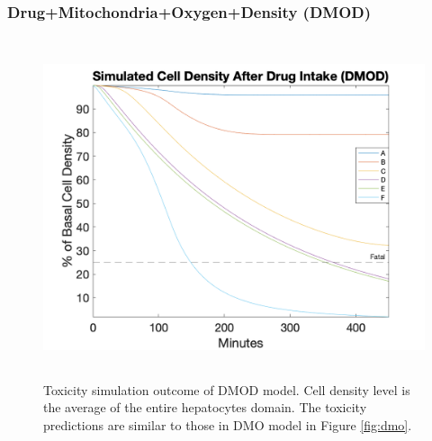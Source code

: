 \documentclass[12pt]{article}
\begin{document}
\subsubsection{Drug+Mitochondria+Oxygen+Density (DMOD)}
\begin{figure}[h!]
\centering
\includegraphics[width = 12cm, height =10cm]{dmod.png}
\caption{Toxicity simulation outcome of DMOD model. Cell density level is the average of the entire hepatocytes domain. The toxicity predictions are similar to those in DMO model in Figure \ref{fig:dmo}.}
\label{fig:dmod}
\end{figure}
\end{document}
